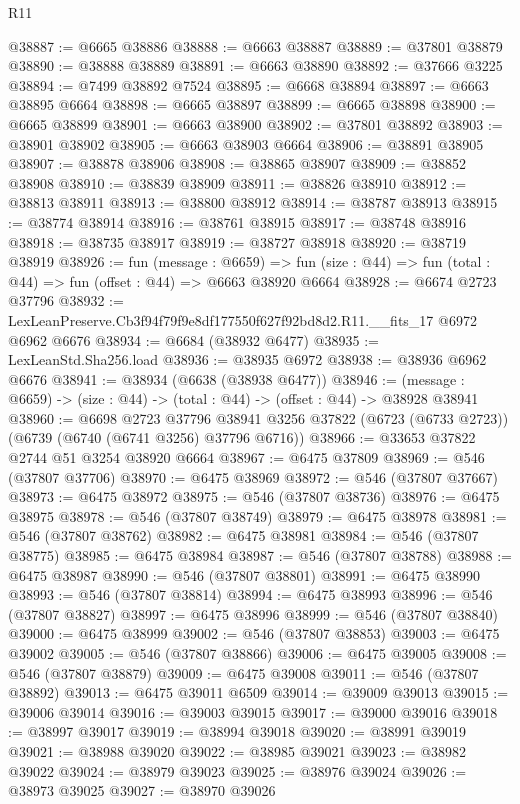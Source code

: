 \begin{lexlean}{R11}
\begin{coremodule}
@38887 := @6665 @38886
@38888 := @6663 @38887
@38889 := @37801 @38879
@38890 := @38888 @38889
@38891 := @6663 @38890
@38892 := @37666 @3225
@38894 := @7499 @38892 @7524
@38895 := @6668 @38894
@38897 := @6663 @38895 @6664
@38898 := @6665 @38897
@38899 := @6665 @38898
@38900 := @6665 @38899
@38901 := @6663 @38900
@38902 := @37801 @38892
@38903 := @38901 @38902
@38905 := @6663 @38903 @6664
@38906 := @38891 @38905
@38907 := @38878 @38906
@38908 := @38865 @38907
@38909 := @38852 @38908
@38910 := @38839 @38909
@38911 := @38826 @38910
@38912 := @38813 @38911
@38913 := @38800 @38912
@38914 := @38787 @38913
@38915 := @38774 @38914
@38916 := @38761 @38915
@38917 := @38748 @38916
@38918 := @38735 @38917
@38919 := @38727 @38918
@38920 := @38719 @38919
@38926 := fun (message : @6659) =>
  fun (size : @44) => fun (total : @44) => fun (offset : @44) => @6663 @38920 @6664
@38928 := @6674 @2723 @37796
@38932 := LexLeanPreserve.Cb3f94f79f9e8df177550f627f92bd8d2.R11.__fits_17 @6972 @6962 @6676
@38934 := @6684 (@38932 @6477)
@38935 := LexLeanStd.Sha256.load
@38936 := @38935 @6972
@38938 := @38936 @6962 @6676
@38941 := @38934 (@6638 (@38938 @6477))
@38946 := (message : @6659) -> (size : @44) -> (total : @44) -> (offset : @44) -> @38928 @38941
@38960 := @6698
    @2723
    @37796
    @38941
    @3256
    @37822
    (@6723 (@6733 @2723))
    (@6739 (@6740 (@6741 @3256) @37796 @6716))
@38966 := @33653 @37822 @2744 @51 @3254 @38920 @6664
@38967 := @6475 @37809
@38969 := @546 (@37807 @37706)
@38970 := @6475 @38969
@38972 := @546 (@37807 @37667)
@38973 := @6475 @38972
@38975 := @546 (@37807 @38736)
@38976 := @6475 @38975
@38978 := @546 (@37807 @38749)
@38979 := @6475 @38978
@38981 := @546 (@37807 @38762)
@38982 := @6475 @38981
@38984 := @546 (@37807 @38775)
@38985 := @6475 @38984
@38987 := @546 (@37807 @38788)
@38988 := @6475 @38987
@38990 := @546 (@37807 @38801)
@38991 := @6475 @38990
@38993 := @546 (@37807 @38814)
@38994 := @6475 @38993
@38996 := @546 (@37807 @38827)
@38997 := @6475 @38996
@38999 := @546 (@37807 @38840)
@39000 := @6475 @38999
@39002 := @546 (@37807 @38853)
@39003 := @6475 @39002
@39005 := @546 (@37807 @38866)
@39006 := @6475 @39005
@39008 := @546 (@37807 @38879)
@39009 := @6475 @39008
@39011 := @546 (@37807 @38892)
@39013 := @6475 @39011 @6509
@39014 := @39009 @39013
@39015 := @39006 @39014
@39016 := @39003 @39015
@39017 := @39000 @39016
@39018 := @38997 @39017
@39019 := @38994 @39018
@39020 := @38991 @39019
@39021 := @38988 @39020
@39022 := @38985 @39021
@39023 := @38982 @39022
@39024 := @38979 @39023
@39025 := @38976 @39024
@39026 := @38973 @39025
@39027 := @38970 @39026

\end{coremodule}
\end{lexlean}
